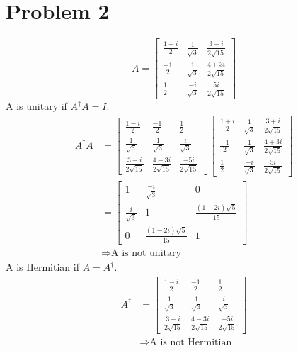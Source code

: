 \documentclass[12pt]{article}
\begin{document}
\section*{Problem 2}
\[A = \begin{bmatrix}
    \frac{1+i}{2} & \frac{1}{\sqrt{3}} & \frac{3+i}{2\sqrt{15}} \\
    \frac{-1}{2} & \frac{1}{\sqrt{3}} & \frac{4 + 3i}{2\sqrt{15}} \\
    \frac{1}{2} & \frac{-i}{\sqrt{3}} & \frac{5i}{2\sqrt{15}}
\end{bmatrix}\]
A is unitary if \(A^{\dagger}A = I\).
\begin{align*}
    A^{\dagger}A &= \begin{bmatrix}
        \frac{1-i}{2} & \frac{-1}{2} & \frac{1}{2} \\
        \frac{1}{\sqrt{3}} & \frac{1}{\sqrt{3}} & \frac{i}{\sqrt{3}} \\
        \frac{3-i}{2\sqrt{15}} & \frac{4-3i}{2\sqrt{15}} & \frac{-5i}{2\sqrt{15}}
    \end{bmatrix} \begin{bmatrix}
        \frac{1+i}{2} & \frac{1}{\sqrt{3}} & \frac{3+i}{2\sqrt{15}} \\
        \frac{-1}{2} & \frac{1}{\sqrt{3}} & \frac{4 + 3i}{2\sqrt{15}} \\
        \frac{1}{2} & \frac{-i}{\sqrt{3}} & \frac{5i}{2\sqrt{15}}
    \end{bmatrix} \\
    &=  \begin{bmatrix}
        1 & \frac{-i}{\sqrt{3}} & 0 \\
        \frac{i}{\sqrt{3}} & 1 & \frac{(1+2i)\sqrt{5}}{15} \\
        0 & \frac{(1-2i)\sqrt{5}}{15} & 1
    \end{bmatrix}\\
    & \Rightarrow \text{A is not unitary}
\end{align*}
A is Hermitian if \(A = A^{\dagger}\).
\begin{align*}
    A^{\dagger} &= \begin{bmatrix}
        \frac{1-i}{2} & \frac{-1}{2} & \frac{1}{2} \\
        \frac{1}{\sqrt{3}} & \frac{1}{\sqrt{3}} & \frac{i}{\sqrt{3}} \\
        \frac{3-i}{2\sqrt{15}} & \frac{4-3i}{2\sqrt{15}} & \frac{-5i}{2\sqrt{15}}
    \end{bmatrix} \\
    & \Rightarrow \text{A is not Hermitian}
\end{align*}
\end{document}
